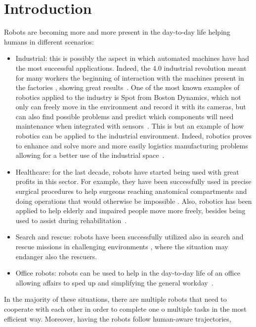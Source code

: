 \chapter{Introduction}
\label{ch:introduction}
Robots are becoming more and more present in the day-to-day life helping humans
in different scenarios:
\begin{itemize}
  \item Industrial: this is possibly the aspect in which automated
    machines have had the most successful applications. Indeed, the 4.0
    industrial revolution meant for many workers the beginning of interaction 
    with the machines present in the factories \cite{industry4_0}, showing great
    results~\cite{coordinationInWarehouse}. One of the most known examples of 
    robotics applied to the industry is Spot from Boston Dynamics, which not 
    only can freely move in the environment and record it with its cameras, but
    can also find possible problems and predict which components will need
    maintenance when integrated with sensors~\cite{bostonDynamics}. This is but
    an example of how robotics can be applied to the industrial environment.
    Indeed, robotics proves to enhance and solve more and more easily logistics
    manufacturing problems allowing for a better use of the industrial
    space~\cite{industry4_0_1}.
  \item Healthcare: for the last decade, robots have started being used with
    great profits in this sector. For example, they have been successfully used
    in precise surgical procedures to help surgeons reaching anatomical
    compartments and doing operations that would otherwise be impossible
    \cite{surgicalRobot}. Also, robotics has been applied to help elderly and
    impaired people move more freely, besides being used to assist during
    rehabilitation~\cite{friWalker}.
  \item Search and rescue: robots have been successfully utilized also in
    search and rescue missions in challenging environments
    \cite{searchRescueDrones}, where the situation may endanger also the
    rescuers. 
  \item Office robots: robots can be used to help in the day-to-day life of an 
    office allowing affairs to sped up and simplifying the general 
    workday~\cite{cobots}.
\end{itemize}
In the majority of these situations, there are multiple robots that need to
cooperate with each other in order to complete one o multiple tasks in the most
efficient way. Moreover, having the robots follow human-aware trajectories, 
